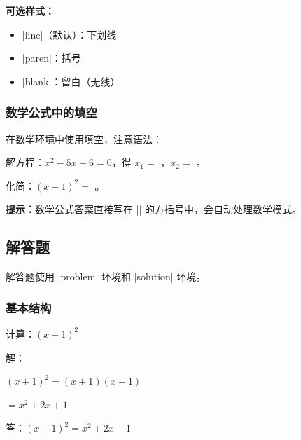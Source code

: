 \textbf{可选样式：}
\begin{itemize}
  \item |line|（默认）：下划线 \fillin[答案]
  \item |paren|：括号 \fillin[type=paren][答案]
  \item |blank|：留白（无线）
\end{itemize}

\subsubsection{数学公式中的填空}

在数学环境中使用填空，注意语法：

\begin{latexcode}
  \begin{question}
    解方程：$x^2 - 5x + 6 = 0$，得 $x_1 = $ \fillin[2]，$x_2 = $ \fillin[3]。
  \end{question}

  \begin{question}
    化简：$(x + 1)^2 = $ \fillin[$x^2 + 2x + 1$]。
  \end{question}
\end{latexcode}

\textbf{提示：}数学公式答案直接写在 |\fillin| 的方括号中，会自动处理数学模式。


\subsection{解答题}

解答题使用 |problem| 环境和 |solution| 环境。

\subsubsection{基本结构}

\begin{latexcode}
  \begin{problem}[points = 10]
    计算：$(x + 1)^2$

    \begin{solution}
      解：

      $(x + 1)^2 = (x + 1)(x + 1)$

      $= x^2 + 2x + 1$

      答：$(x + 1)^2 = x^2 + 2x + 1$
    \end{solution}
  \end{problem}
\end{latexcode}

